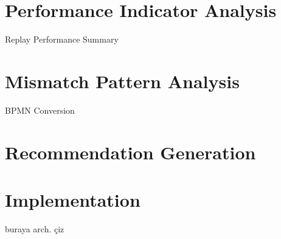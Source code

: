 \section{Performance Indicator Analysis}
\label{sec:performance-indicator-analysis}
	Replay
	Performance Summary

\section{Mismatch Pattern Analysis}
\label{sec:mismatch-pattern-analysis}
	BPMN Conversion


\section{Recommendation Generation}
\label{sec:recommendation-generation}



\section{Implementation}
\label{sec:implementation}
buraya arch. çiz
